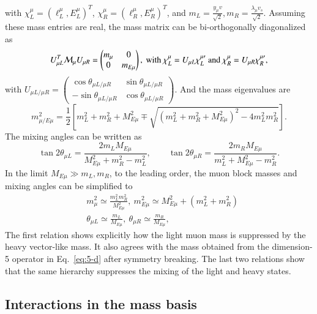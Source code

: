 \documentclass[onecolumn, aps, nofootinbib, prd, preprint, floats, floatfix, amsmath, amssymb, superscriptaddress, preprintnumbers]{revtex4-2}
\begin{document}
with $\chi^\mu_L=(\ell^\mu_L, E^\mu_L)^T$, $\chi^\mu_R =
(\ell^\mu_R,E^\mu_R)^T$, and $m_L=\frac{y_\mu v}{\sqrt2},
m_R=\frac{\lambda_\mu v_s}{\sqrt2}$. Assuming these mass entries are real, the mass matrix can be bi-orthogonally diagonalized as
\begin{equation}
U_{\mu L}^T\mathcal{M}_\mu U_{\mu R} =
\begin{pmatrix}
m_\mu &0\\
0&m_{E\mu}
\end{pmatrix},~ {\rm with}~
\chi^\mu_L=U_{\mu L} \chi^{\mu \prime}_L~{\rm and}~
\chi^\mu_R=U_{\mu R} \chi^{\mu \prime}_R,
\end{equation}
with $U_{\mu L/\mu R}=\begin{pmatrix}\cos\theta_{\mu L/\mu R} &\sin\theta_{\mu L/\mu R}\\-\sin\theta_{\mu L/\mu R} & \cos\theta_{\mu L/\mu R} \end{pmatrix}$. And the mass eigenvalues are
\begin{equation}
m_{\mu/E\mu}^2=
\frac{1}{2}
\left[
m_L^2+m_R^2+M_{E\mu}^2 \mp
\sqrt{(m_L^2+m_R^2+M_{E\mu}^2)^2-4m_L^2m_R^2}
\right].
\label{eq:exact-masses-2by2}
\end{equation}
The mixing angles can be written as
\begin{equation}
\tan2\theta_{\mu L}= \frac{2m_L M_{E\mu}}{M_{E\mu}^2+m_R^2-m_L^2},
\qquad
\tan2\theta_{\mu R}=\frac{2m_R M_{E\mu}}{m_L^2+M_{E\mu}^2-m_R^2}.
\label{eq:mixing-angles-2by2}
\end{equation}
In the limit $M_{E\mu}\gg m_L, m_R$, to the leading order, the muon block masses and mixing angles can be simplified to
\begin{equation}
\begin{aligned}
    &m_\mu^2\simeq\frac{m_L^2 m_R^2}{M_{E\mu}^2},~ m_{E\mu}^2\simeq M_{E\mu}^2+(m_L^2 + m_R^2)\\
    &\theta_{\mu L}\simeq \frac{m_L}{M_{E\mu}},~ \theta_{\mu R}\simeq \frac{m_R}{M_{E\mu}},
\end{aligned}
\end{equation}
The first relation shows explicitly how the light muon mass is suppressed by
the heavy vector-like mass.  It also agrees with the mass obtained from the
dimension-5 operator in Eq.~\eqref{eq:5-d} after symmetry breaking.  The last
two relations show that the same hierarchy suppresses the mixing of the light
and heavy states.

\subsection{Interactions in the mass basis}
\end{document}
